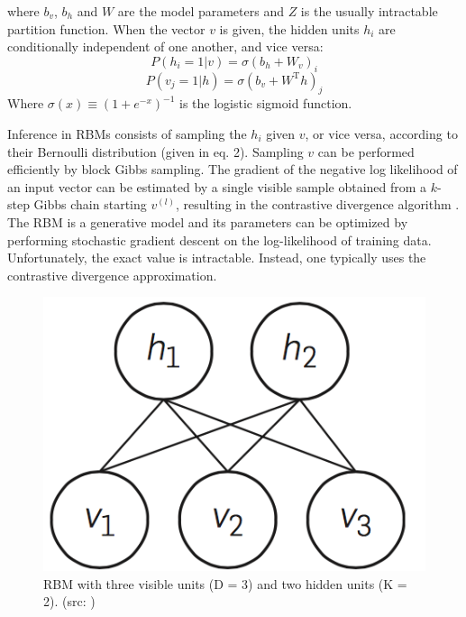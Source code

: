 \documentclass[letterpaper, 10 pt, conference]{ieeeconf}
\begin{document}
where $b_v$, $b_h$ and $W$ are the model parameters and $Z$ is the usually intractable partition function. When the vector $v$ is given, the hidden units $h_i$ are conditionally independent of one another, and vice versa: 
\begin{equation}
P(h_i = 1 | v) = \sigma(b_h + W_v)_i
\end{equation}
\begin{equation}
P(v_j = 1 | h) = \sigma(b_v + W^\textrm{T} h)_j
\end{equation}
Where $\sigma(x) \equiv(1 + e^{-x})^{-1}$ is the logistic sigmoid function.

Inference in RBMs consists of sampling the $h_i$ given $v$, or vice versa, according to their Bernoulli distribution (given in eq. 2). Sampling $v$ can be performed efficiently by block Gibbs sampling. The gradient of the negative log likelihood of an input vector can be estimated by a single visible sample obtained from a $k$-step Gibbs chain starting $v^{(l)}$, resulting in the contrastive divergence algorithm \cite{c9}. The RBM is a generative model and its parameters can be optimized by performing stochastic gradient descent on the log-likelihood of training data. Unfortunately, the exact value is intractable. Instead, one typically uses the contrastive divergence approximation.
%
\begin{figure}[thpb]
      \centering
      \includegraphics[scale=0.35]{rbm.png}
      \caption{RBM with three visible units (D = 3) and two hidden units (K = 2). (src: \cite{c12})}
      \label{fig:rbm}
\end{figure}
\end{document}
